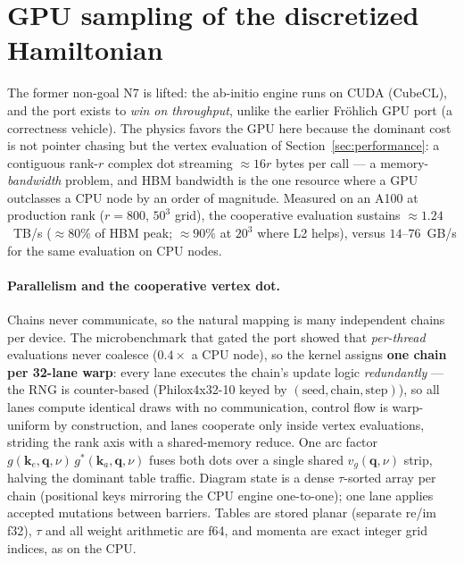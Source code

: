 \documentclass[11pt]{article}
\newcommand{\kv}{\mathbf{k}}
\newcommand{\qv}{\mathbf{q}}
\begin{document}
\section{GPU sampling of the discretized Hamiltonian}
\label{sec:gpu}

The former non-goal N7 is lifted: the ab-initio engine runs on CUDA (CubeCL), and the port
exists to \emph{win on throughput}, unlike the earlier Fr\"ohlich GPU port (a correctness
vehicle). The physics favors the GPU here because the dominant cost is not pointer chasing
but the vertex evaluation of Section~\ref{sec:performance}: a contiguous rank-$r$ complex
dot streaming $\approx16r$ bytes per call --- a memory-\emph{bandwidth} problem, and HBM
bandwidth is the one resource where a GPU outclasses a CPU node by an order of magnitude.
Measured on an A100 at production rank ($r=800$, $50^{3}$ grid), the cooperative evaluation
sustains $\approx1.24$~TB/s ($\approx80\%$ of HBM peak; $\approx90\%$ at $20^{3}$ where L2
helps), versus $14$--$76$~GB/s for the same evaluation on CPU nodes.

\paragraph{Parallelism and the cooperative vertex dot.}
Chains never communicate, so the natural mapping is many independent chains per device.
The microbenchmark that gated the port showed that \emph{per-thread} evaluations never
coalesce ($0.4\times$ a CPU node), so the kernel assigns \textbf{one chain per 32-lane
warp}: every lane executes the chain's update logic \emph{redundantly} --- the RNG is
counter-based (Philox4x32-10 keyed by $(\text{seed},\text{chain},\text{step})$), so all
lanes compute identical draws with no communication, control flow is warp-uniform by
construction, and lanes cooperate only inside vertex evaluations, striding the rank axis
with a shared-memory reduce. One arc factor $g(\kv_{e},\qv,\nu)\,g^{*}(\kv_{a},\qv,\nu)$
fuses both dots over a single shared $v_{g}(\qv,\nu)$ strip, halving the dominant table
traffic. Diagram state is a dense $\tau$-sorted array per chain (positional keys mirroring
the CPU engine one-to-one); one lane applies accepted mutations between barriers. Tables
are stored planar (separate re/im f32), $\tau$ and all weight arithmetic are f64, and
momenta are exact integer grid indices, as on the CPU.
\end{document}
